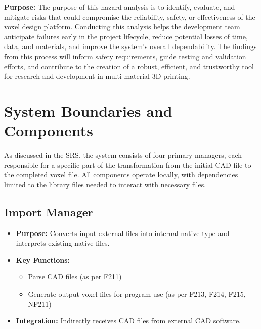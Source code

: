 \documentclass{article}
\begin{document}
\textbf{Purpose:} 
The purpose of this hazard analysis is to identify, evaluate, and mitigate risks that could compromise the reliability, safety, or effectiveness of the voxel design platform. Conducting this analysis helps the development team anticipate failures early in the project lifecycle, reduce potential losses of time, data, and materials, and improve the system’s overall dependability. The findings from this process will inform safety requirements, guide testing and validation efforts, and contribute to the creation of a robust, efficient, and trustworthy tool for research and development in multi-material 3D printing.

\section{System Boundaries and Components}

\iffalse
\wss{Dividing the system into components will help you brainstorm the hazards.
You shouldn't do a full design of the components, just get a feel for the major
ones.  For projects that involve hardware, the components will typically include
each individual piece of hardware.  If your software will have a database, or an
important library, these are also potential components.}
\fi

As discussed in the SRS, the system consists of four primary managers, each responsible
for a specific part of the transformation from the initial CAD file to the completed 
voxel file. All components operate locally, with dependencies limited to
the library files needed to interact with necessary files.

\subsection{Import Manager}
\begin{itemize}
    \item \textbf{Purpose:} Converts input external files into internal native type and interprets existing native files.
    \item \textbf{Key Functions:} 
    \begin{itemize}
        \item Parse CAD files (as per F211)
        \item Generate output voxel files for program use (as per F213, F214, F215, NF211)
    \end{itemize}
    \item \textbf{Integration:} Indirectly receives CAD files from external CAD software.
\end{itemize}
\end{document}
